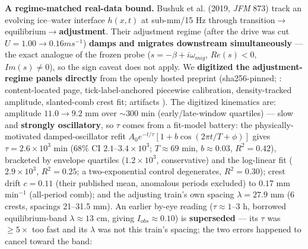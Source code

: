 \documentclass[11pt]{article}
\begin{document}
\textbf{A regime-matched real-data bound.} Bushuk et al. (2019, \emph{JFM} 873) track an evolving ice–water interface $h(x,t)$ at sub-mm/15 Hz through transition\ensuremath{\to}equilibrium\ensuremath{\to}\textbf{adjustment}. Their adjustment regime (after the drive was cut $U=1.00\to 0.16 m s^{-1}$) \textbf{damps and migrates downstream simultaneously} — the exact analogue of the frozen probe ($s=-\beta +i\omega _{mig}$, $Re(s)<0$, $Im(s)\ne 0$), so the sign caveat does not apply. We \textbf{digitized the adjustment-regime panels directly} from the openly hosted preprint (sha256-pinned; : content-located page, tick-label-anchored piecewise calibration, density-tracked amplitude, slanted-comb crest fit; artifacts ). The digitized kinematics are: amplitude $11.0\to 9.2$ mm over $\sim 300$ min (early/late-window quartiles) — slow and \textbf{strongly oscillatory}, so $\tau $ comes from a fit-model battery: the physically-motivated damped-oscillator refit $A_{0}e^{-t/\tau }[1+b\cos (2\pi t/T+\phi )]$ gives $\tau =2.6\times 10^{3}$ min (68\% CI $2.1$–$3.4\times 10^{3}$; $T\approx 69$ min, $b\approx 0.03$, $R^{2}=0.42$), bracketed by envelope quartiles ($1.2\times 10^{3}$, conservative) and the log-linear fit ($2.9\times 10^{3}$, $R^{2}=0.25$; a two-exponential control degenerates, $R^{2}=0.30$); crest drift $c=0.11$ (their published mean, anomalous periods excluded) to $0.17$ mm min$^{-1}$ (all-period comb); and the adjusting train's own spacing $\lambda =27.9$ mm (6 crests, spacings 21–31.5 mm). An earlier by-eye reading ($\tau \approx 1–3$ h, borrowed equilibrium-band $\lambda \approx 13$ cm, giving $I_{obs}\approx 0.10$) is \textbf{superseded} — its $\tau $ was $\ge 5\times $ too fast and its $\lambda $ was not this train's spacing; the two errors happened to cancel toward the band:
\end{document}
